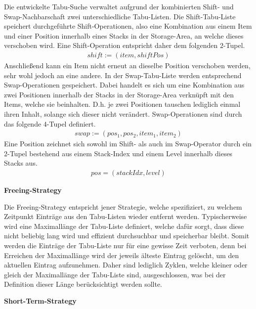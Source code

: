 Die entwickelte Tabu-Suche verwaltet aufgrund der kombinierten Shift- und Swap-Nachbarschaft zwei unterschiedliche
Tabu-Listen. Die Shift-Tabu-Liste speichert durchgeführte Shift-Operationen, also eine Kombination aus einem Item und einer Position innerhalb eines Stacks in der Storage-Area, an welche dieses verschoben wird. Eine Shift-Operation entspricht daher dem folgenden $2$-Tupel.
\begin{gather*}
shift := (item, shiftPos)
\end{gather*}
Anschließend kann ein Item nicht erneut an dieselbe Position verschoben werden, sehr wohl jedoch an eine andere.
In der Swap-Tabu-Liste werden entsprechend Swap-Operationen gespeichert. Dabei handelt es sich um eine Kombination aus zwei Positionen innerhalb der Stacks in der Storage-Area verknüpft mit den Items, welche sie beinhalten.
D.h. je zwei Positionen tauschen lediglich einmal ihren Inhalt, solange sich dieser nicht verändert.
Swap-Operationen sind durch das folgende $4$-Tupel definiert.
\begin{gather*}
swap := (pos_1, pos_2, item_1, item_2)
\end{gather*}
Eine Position zeichnet sich sowohl im Shift- als auch im Swap-Operator durch ein $2$-Tupel bestehend aus einem
Stack-Index und einem Level innerhalb dieses Stacks aus.
\begin{gather*}
 pos = (stackIdx, level)
\end{gather*}

\textbf{Freeing-Strategy}

Die Freeing-Strategy entspricht jener Strategie, welche spezifiziert, zu welchem Zeitpunkt Einträge aus den
Tabu-Listen wieder entfernt werden. Typischerweise wird eine Maximallänge der Tabu-Liste definiert,
welche dafür sorgt, dass diese nicht beliebig lang wird und effizient durchsuchbar und speicherbar bleibt.
Somit werden die Einträge der Tabu-Liste nur für eine gewisse Zeit verboten, denn bei Erreichen der Maximallänge
wird der jeweils älteste Eintrag gelöscht, um den aktuellen Eintrag aufzunehmen.
Daher sind lediglich Zyklen, welche kleiner oder gleich der Maximallänge der Tabu-Liste sind,
ausgeschlossen, was bei der Definition dieser Länge berücksichtigt werden sollte.

\textbf{Short-Term-Strategy}


